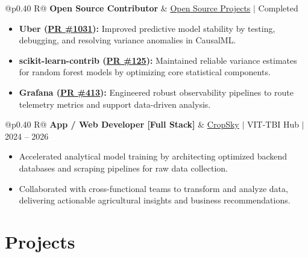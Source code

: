 \documentclass[a4paper,10pt]{article}
\newcommand{\ulink}[2]{\href{#1}{#2}}
\newcommand{\subheading}[1]{{\color[HTML]{0A0A0A}\fontsize{12}{14}\selectfont\bfseries #1}}
\newcommand{\meta}[1]{{\color[HTML]{5C5C5C}\fontsize{10.5}{12.5}\selectfont #1}}
\begin{document}
\begin{tabularx}{\linewidth}{@{}p{0.40\linewidth} R@{}}
\subheading{Open Source Contributor} & \meta{\ulink{https://github.com/su-jin1425/My-Open-Source-Contributions}{Open Source Projects} $|$ Completed}
\end{tabularx}
\begin{itemize}[nosep, leftmargin=1.5em, itemsep=2pt, topsep=2pt]
  \item {\color[HTML]{0A0A0A}\fontsize{11}{14}\selectfont \textbf{Uber (\ulink{https://github.com/uber/causalml/pull/1031}{PR \#1031}):} Improved predictive model stability by testing, debugging, and resolving variance anomalies in CausalML.}
  \item {\color[HTML]{0A0A0A}\fontsize{11}{14}\selectfont \textbf{scikit-learn-contrib (\ulink{https://github.com/scikit-learn-contrib/forest-confidence-interval/pull/125}{PR \#125}):} Maintained reliable variance estimates for random forest models by optimizing core statistical components.}
  \item {\color[HTML]{0A0A0A}\fontsize{11}{14}\selectfont \textbf{Grafana (\ulink{https://github.com/grafana/alloy-scenarios/pull/413}{PR \#413}):} Engineered robust observability pipelines to route telemetry metrics and support data-driven analysis.}
\end{itemize}

\begin{tabularx}{\linewidth}{@{}p{0.40\linewidth} R@{}}
\subheading{App / Web Developer [Full Stack]} & \meta{\ulink{https://sites.google.com/view/cropsky/home}{CropSky} $|$ VIT-TBI Hub $|$ 2024 -- 2026}
\end{tabularx}
\begin{itemize}[nosep, leftmargin=1.5em, itemsep=2pt, topsep=2pt]
  \item {\color[HTML]{0A0A0A}\fontsize{11}{14}\selectfont Accelerated analytical model training by architecting optimized backend databases and scraping pipelines for raw data collection.}
  \item {\color[HTML]{0A0A0A}\fontsize{11}{14}\selectfont Collaborated with cross-functional teams to transform and analyze data, delivering actionable agricultural insights and business recommendations.}
\end{itemize}

\section{Projects}
\vspace{2pt}
\end{document}
